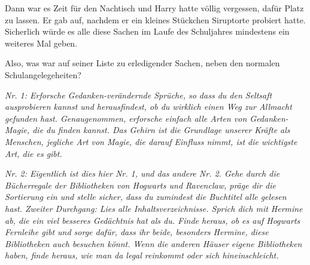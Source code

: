 Dann war es Zeit für den Nachtisch und Harry hatte völlig vergessen, dafür Platz zu lassen. Er gab auf, nachdem er ein kleines Stückchen Siruptorte probiert hatte. Sicherlich würde es alle diese Sachen im Laufe des Schuljahres mindestens ein weiteres Mal geben.

Also, was war auf seiner Liste zu erledigender Sachen, neben den normalen Schulangelegeheiten?

\emph{Nr. 1: Erforsche Gedanken-verändernde Sprüche, so dass du den Seltsaft ausprobieren kannst und herausfindest, ob du wirklich einen Weg zur Allmacht gefunden hast. Genaugenommen, erforsche einfach alle Arten von Gedanken-Magie, die du finden kannst. Das Gehirn ist die Grundlage unserer Kräfte als Menschen, jegliche Art von Magie, die darauf Einfluss nimmt, ist die wichtigste Art, die es gibt.}

\emph{Nr. 2: Eigentlich ist dies hier Nr. 1, und das andere Nr. 2. Gehe durch die Bücherregale der Bibliotheken von Hogwarts und Ravenclaw, präge dir die Sortierung ein und stelle sicher, dass du zumindest die Buchtitel alle gelesen hast. Zweiter Durchgang: Lies alle Inhaltsverzeichnisse. Sprich dich mit Hermine ab, die ein viel besseres Gedächtnis hat als du. Finde heraus, ob es auf Hogwarts Fernleihe gibt und sorge dafür, dass ihr beide, besonders Hermine, diese Bibliotheken auch besuchen könnt. Wenn die anderen Häuser eigene Bibliotheken haben, finde heraus, wie man da legal reinkommt oder sich hineinschleicht.}

